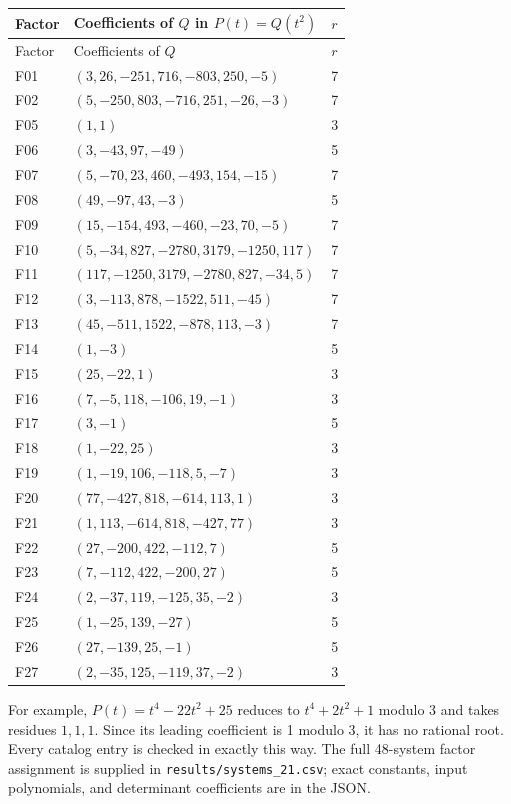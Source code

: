 \documentclass[11pt]{article}
\theoremstyle{definition}\newtheorem{definition}[theorem]{Definition}
\theoremstyle{remark}\newtheorem{remark}[theorem]{Remark}
\begin{document}
\begin{center}
\small\setlength{\tabcolsep}{7pt}\renewcommand{\arraystretch}{1.14}
\begin{longtable}{lll}
\toprule
Factor & Coefficients of $Q$ in $P(t)=Q(t^2)$ & $r$\\
\midrule
\endfirsthead
\toprule Factor & Coefficients of $Q$ & $r$\\\midrule
\endhead
F01 & $(3,26,-251,716,-803,250,-5)$ & 7 \\
F02 & $(5,-250,803,-716,251,-26,-3)$ & 7 \\
F05 & $(1,1)$ & 3 \\
F06 & $(3,-43,97,-49)$ & 5 \\
F07 & $(5,-70,23,460,-493,154,-15)$ & 7 \\
F08 & $(49,-97,43,-3)$ & 5 \\
F09 & $(15,-154,493,-460,-23,70,-5)$ & 7 \\
F10 & $(5,-34,827,-2780,3179,-1250,117)$ & 7 \\
F11 & $(117,-1250,3179,-2780,827,-34,5)$ & 7 \\
F12 & $(3,-113,878,-1522,511,-45)$ & 7 \\
F13 & $(45,-511,1522,-878,113,-3)$ & 7 \\
F14 & $(1,-3)$ & 5 \\
F15 & $(25,-22,1)$ & 3 \\
F16 & $(7,-5,118,-106,19,-1)$ & 3 \\
F17 & $(3,-1)$ & 5 \\
F18 & $(1,-22,25)$ & 3 \\
F19 & $(1,-19,106,-118,5,-7)$ & 3 \\
F20 & $(77,-427,818,-614,113,1)$ & 3 \\
F21 & $(1,113,-614,818,-427,77)$ & 3 \\
F22 & $(27,-200,422,-112,7)$ & 5 \\
F23 & $(7,-112,422,-200,27)$ & 5 \\
F24 & $(2,-37,119,-125,35,-2)$ & 3 \\
F25 & $(1,-25,139,-27)$ & 5 \\
F26 & $(27,-139,25,-1)$ & 5 \\
F27 & $(2,-35,125,-119,37,-2)$ & 3 \\
\bottomrule
\end{longtable}
\end{center}
For example, $P(t)=t^4-22t^2+25$ reduces to $t^4+2t^2+1$ modulo 3 and takes residues $1,1,1$. Since its leading coefficient is 1 modulo 3, it has no rational root. Every catalog entry is checked in exactly this way. The full 48-system factor assignment is supplied in \texttt{results/systems\_21.csv}; exact constants, input polynomials, and determinant coefficients are in the JSON.
\end{document}
